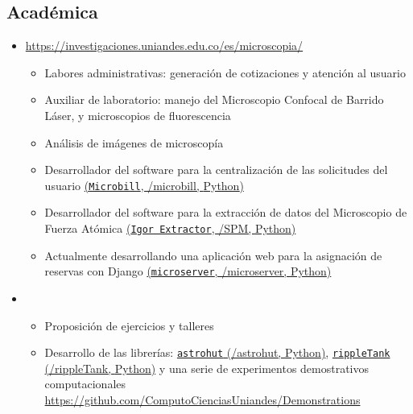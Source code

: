 \documentclass[11pt, letterpaper, sans]{moderncv}        %
\begin{document}
	\subsection{Acad\'emica}
		\begin{itemize}
			\item
			{
				{
					\url{https://investigaciones.uniandes.edu.co/es/microscopia/}
					\vspace{3pt}
					\begin{itemize}
						\item Labores administrativas: generación de cotizaciones y atención al usuario
						\item Auxiliar de laboratorio: manejo del Microscopio Confocal de Barrido Láser, y microscopios de fluorescencia
						\item Análisis de imágenes de microscopía
						\item Desarrollador del software para la centralización de las solicitudes del usuario \href{https://github.com/jsbarbosa/microbill}{(\texttt{Microbill}, \faGithub/microbill, {\color{blue} Python})}
						\item Desarrollador del software para la extracci\'on de datos del Microscopio de Fuerza Atómica
						\href{https://github.com/jsbarbosa/SPM}{(\texttt{Igor Extractor}, \faGithub/SPM, {\color{blue} Python})}
						\item Actualmente desarrollando una aplicaci\'on web para la asignaci\'on de reservas con {\color{blue} Django} \href{https://github.com/jsbarbosa/microserver}{(\texttt{microserver}, \faGithub/microserver, {\color{blue} Python})}
					\end{itemize}
				}
			}
			\item
			{
				{
					\vspace{3pt}
					\begin{itemize}
						\item Proposición de ejercicios y talleres
						\item Desarrollo de las librerías: \href{https://github.com/jsbarbosa/rastrohut}{\texttt{astrohut} (\faGithub/astrohut, {\color{blue} Python})},  \href{https://github.com/jsbarbosa/rippleTank}{\texttt{rippleTank} (\faGithub/rippleTank, {\color{blue} Python})} y una serie de experimentos demostrativos computacionales \url{https://github.com/ComputoCienciasUniandes/Demonstrations}

\end{itemize}}}
\end{itemize}
\end{document}
